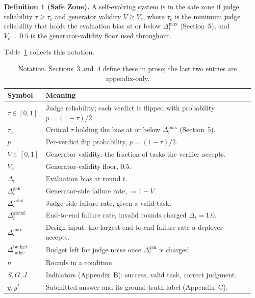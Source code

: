 \documentclass{article}
\begin{document}
\textbf{Definition 1 (Safe Zone).} A self-evolving system is in the safe zone if judge reliability
$\tau \ge \tau_c$ and generator validity $V \ge V_c$, where $\tau_c$ is the minimum judge reliability
that holds the evaluation bias at or below $\Delta_t^{\max}$ (Section~5), and $V_c = 0.5$ is the
generator-validity floor used throughout.

Table~\ref{tab:notation} collects this notation.

\begin{table}[t]
  \centering
  \caption{Notation. Sections~3 and~4 define these in prose; the last two entries are
  appendix-only.}
  \label{tab:notation}
  \small
  \begin{tabularx}{\textwidth}{@{}lX@{}}
    \toprule
    Symbol & Meaning \\
    \midrule
    $\tau \in [0,1]$ & Judge reliability; each verdict is flipped with probability $p = (1-\tau)/2$. \\
    $\tau_c$ & Critical $\tau$ holding the bias at or below $\Delta_t^{\max}$ (Section~5). \\
    $p$ & Per-verdict flip probability, $p = (1-\tau)/2$. \\
    $V \in [0,1]$ & Generator validity: the fraction of tasks the verifier accepts. \\
    $V_c$ & Generator-validity floor, $0.5$. \\
    $\Delta_t$ & Evaluation bias at round $t$. \\
    \midrule
    $\Delta_t^{\mathrm{gen}}$ & Generator-side failure rate, $= 1 - V$. \\
    $\Delta_t^{\mathrm{valid}}$ & Judge-side failure rate, given a valid task. \\
    $\Delta_t^{\mathrm{global}}$ & End-to-end failure rate, invalid rounds charged $\Delta_t = 1.0$. \\
    $\Delta_t^{\max}$ & Design input: the largest end-to-end failure rate a deployer accepts. \\
    $\Delta_{\mathrm{judge}}^{\mathrm{budget}}$ & Budget left for judge noise once $\Delta_t^{\mathrm{gen}}$ is charged. \\
    $n$ & Rounds in a condition. \\
    \midrule
    $S, G, J$ & Indicators (Appendix~B): success, valid task, correct judgment. \\
    $y, y^{*}$ & Submitted answer and its ground-truth label (Appendix~C). \\
    \bottomrule
  \end{tabularx}
\end{table}
\end{document}
